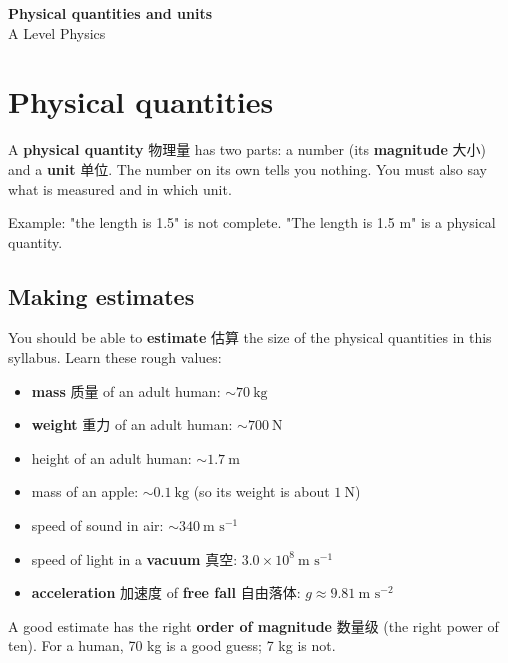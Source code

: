 \documentclass[11pt]{article}
\begin{document}
\begin{center}
  {\LARGE\bfseries Physical quantities and units}\\[0.35em]
  {\large A Level Physics}
\end{center}
\vspace{0.6em}

\section*{Physical quantities}

A \textbf{physical quantity} 物理量 has two parts: a number (its \textbf{magnitude} 大小) and a \textbf{unit} 单位. The number on its own tells you nothing. You must also say what is measured and in which unit.

Example: "the length is 1.5" is not complete. "The length is 1.5 m" is a physical quantity.

\subsection*{Making estimates}

You should be able to \textbf{estimate} 估算 the size of the physical quantities in this syllabus. Learn these rough values:

\begin{itemize}
\item \textbf{mass} 质量 of an adult human: $\sim 70\ \text{kg}$

\item \textbf{weight} 重力 of an adult human: $\sim 700\ \text{N}$

\item height of an adult human: $\sim 1.7\ \text{m}$

\item mass of an apple: $\sim 0.1\ \text{kg}$ (so its weight is about $1\ \text{N}$)

\item speed of sound in air: $\sim 340\ \text{m s}^{-1}$

\item speed of light in a \textbf{vacuum} 真空: $3.0 \times 10^{8}\ \text{m s}^{-1}$

\item \textbf{acceleration} 加速度 of \textbf{free fall} 自由落体: $g \approx 9.81\ \text{m s}^{-2}$

\end{itemize}

A good estimate has the right \textbf{order of magnitude} 数量级 (the right power of ten). For a human, 70 kg is a good guess; 7 kg is not.
\end{document}
